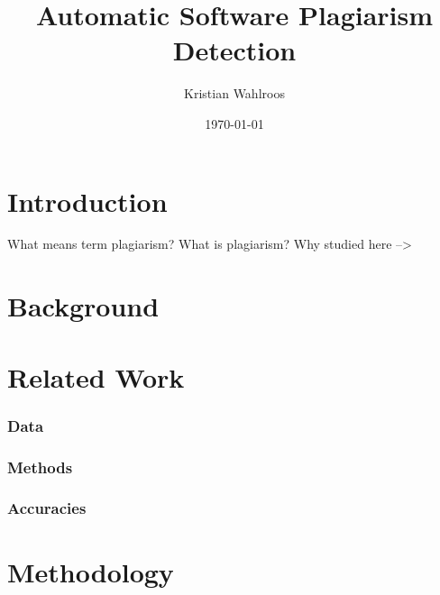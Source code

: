 \documentclass[english, grading]{tktltiki2}
\title{Automatic Software Plagiarism Detection}
\author{Kristian Wahlroos}
\date{\today}
\theoremstyle{definition}
\theoremstyle{remark}
\numberwithin{equation}{section} %
\begin{document}

\frontmatter      %

\maketitle        %
\makeabstract     %

\tableofcontents  %


\mainmatter       %

\section{Introduction}

What means term plagiarism?
What is plagiarism?
Why studied here --> 

\section{Background}



\newpage

\section{Related Work}


\subsubsection{Data}


\subsubsection{Methods}


\subsubsection{Accuracies}


\newpage


\section{Methodology}
\end{document}
